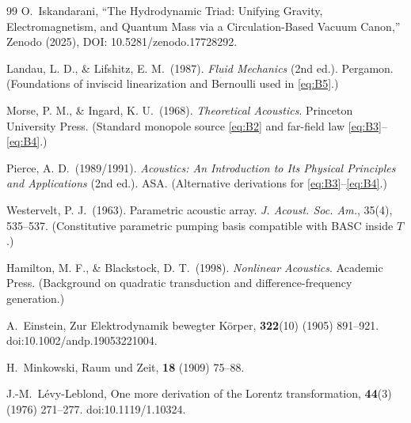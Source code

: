 \documentclass[10pt,reprint,aps,onecolumn,nofootinbib]{revtex4-2}
\begin{document}
\begin{thebibliography}{99}
        O.~Iskandarani,
        ``The Hydrodynamic Triad: Unifying Gravity, Electromagnetism, and Quantum Mass
        via a Circulation-Based Vacuum Canon,''
        Zenodo (2025), DOI: 10.5281/zenodo.17728292.

        Landau, L. D., \& Lifshitz, E. M.\ (1987).
        \emph{Fluid Mechanics} (2nd ed.). Pergamon.
        (Foundations of inviscid linearization and Bernoulli used in \eqref{eq:B5}.)

        Morse, P. M., \& Ingard, K. U.\ (1968).
        \emph{Theoretical Acoustics}. Princeton University Press.
        (Standard monopole source \eqref{eq:B2} and far-field law \eqref{eq:B3}–\eqref{eq:B4}.)

        Pierce, A. D.\ (1989/1991).
        \emph{Acoustics: An Introduction to Its Physical Principles and Applications} (2nd ed.). ASA.
        (Alternative derivations for \eqref{eq:B3}–\eqref{eq:B4}.)

        Westervelt, P. J.\ (1963).
        Parametric acoustic array.
        \emph{J. Acoust. Soc. Am.}, 35(4), 535–537.
        (Constitutive parametric pumping basis compatible with BASC inside $T$.)

        Hamilton, M. F., \& Blackstock, D. T.\ (1998).
        \emph{Nonlinear Acoustics}. Academic Press.
        (Background on quadratic transduction and difference-frequency generation.)


        A.~Einstein,
        \newblock Zur Elektrodynamik bewegter K{\"o}rper,
         \textbf{322}(10) (1905) 891--921.
        \newblock doi:10.1002/andp.19053221004.

        H.~Minkowski,
        \newblock Raum und Zeit,
         \textbf{18} (1909) 75--88.

        J.-M.~L{\'e}vy-Leblond,
        \newblock One more derivation of the Lorentz transformation,
         \textbf{44}(3) (1976) 271--277.
        \newblock doi:10.1119/1.10324.



\end{thebibliography}
\end{document}
